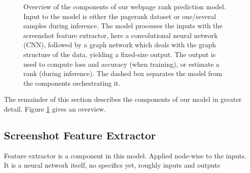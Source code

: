 \begin{figure}
    \centering

    \caption[Webpage rank prediction model architecture overview]{Overview of the components of our webpage rank prediction model. Input to the model is either the pagerank dataset or one/several samples during inference. The model processes the inputs with the screenshot feature extractor, here a convolutional neural network (CNN), followed by a graph network which deals with the graph structure of the data, yielding a fixed-size output. The output is used to compute loss and accuracy (when training), or estimate a rank (during inference). The dashed box separates the model from the components orchestrating it.}
    \label{fig:methodcomponents}
\end{figure}

The remainder of this section describes the components of our model in greater detail. Figure \ref{fig:methodcomponents} gives an overview.

\subsection{Screenshot Feature Extractor}

Feature extractor is a component in this model. Applied node-wise to the inputs. It is a neural network itself, no specifics yet, roughly inputs and outputs


